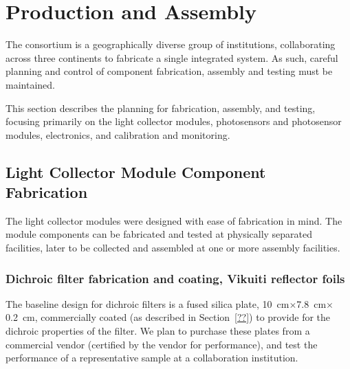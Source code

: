 \section{Production and Assembly}
\label{sec:fdsp-pd-prod-assy}
The \single {} consortium is a geographically diverse group of institutions, collaborating across three continents to fabricate a single integrated system.  As such, careful planning and control of component fabrication, assembly and testing must be maintained.

This section describes the planning for fabrication, assembly, and testing, focusing primarily on the  light collector modules, photosensors and photosensor modules, electronics, and calibration and monitoring.

\subsection{Light Collector Module Component Fabrication}

The  light collector modules were designed with ease of fabrication in mind.  The module components can be fabricated and  tested at physically separated facilities, later to be collected and assembled at one or more assembly facilities.  %

\subsubsection{Dichroic filter fabrication and coating, Vikuiti reflector foils}

The baseline design for dichroic filters is %
a fused silica plate,  \SI{10}{cm}$\times$\SI{7.8}{cm}$\times$\SI{0.2}{cm}, commercially coated (as described %
in Section~\ref{??}) to provide for the dichroic properties of the filter.  %
We plan to purchase these plates from a commercial vendor (certified by the vendor for performance), and test the performance of a representative sample at a collaboration institution.  

